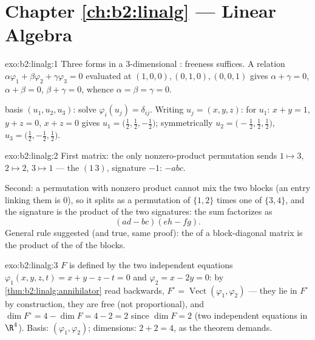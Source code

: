 \section*{Chapter \ref{ch:b2:linalg} --- Linear Algebra}

\begin{solution}{exo:b2:linalg:1}
Three forms in a $3$-dimensional : freeness suffices. A relation
$\alpha\varphi_1 + \beta\varphi_2 + \gamma\varphi_3 = 0$ evaluated at
$(1,0,0), (0,1,0), (0,0,1)$ gives $\alpha + \gamma = 0$, $\alpha +
\beta = 0$, $\beta + \gamma = 0$, whence $\alpha = \beta = \gamma =
0$.

 basis $(u_1, u_2, u_3)$: solve $\varphi_i(u_j) =
\delta_{ij}$. Writing $u_j = (x, y, z)$: for $u_1$: $x + y = 1$,
$y + z = 0$, $x + z = 0$ gives $u_1 = \bigl(\tfrac12, \tfrac12,
-\tfrac12\bigr)$; symmetrically $u_2 = \bigl(-\tfrac12, \tfrac12,
\tfrac12\bigr)$, $u_3 = \bigl(\tfrac12, -\tfrac12, \tfrac12\bigr)$.
\end{solution}

\begin{solution}{exo:b2:linalg:2}
First matrix: the only nonzero-product permutation sends $1 \mapsto
3$, $2 \mapsto 2$, $3 \mapsto 1$ --- the  $(1\,3)$,
signature $-1$:  $-abc$.

Second: a permutation with nonzero product cannot mix the two
blocks (an entry linking them is $0$), so it splits as a permutation
of $\{1,2\}$ times one of $\{3,4\}$, and the signature is the
product of the two signatures: the sum factorizes as
\[
(ad - bc)(eh - fg) .
\]
General rule suggested (and true, same proof): the  of a
block-diagonal matrix is the product of the  of the
blocks.
\end{solution}

\begin{solution}{exo:b2:linalg:3}
$F$ is defined by the two independent equations $\varphi_1(x,y,z,t)
= x + y - z - t = 0$ and $\varphi_2 = x - 2y = 0$: by
\cref{thm:b2:linalg:annihilator} read backwards, $F^\circ =
\operatorname{Vect}(\varphi_1, \varphi_2)$ --- they lie in $F^\circ$
by construction, they are free (not proportional), and $\dim F^\circ
= 4 - \dim F = 4 - 2 = 2$ since $\dim F = 2$ (two independent
equations in $\R^4$). Basis: $(\varphi_1, \varphi_2)$; dimensions:
$2 + 2 = 4$, as the theorem demands.
\end{solution}

